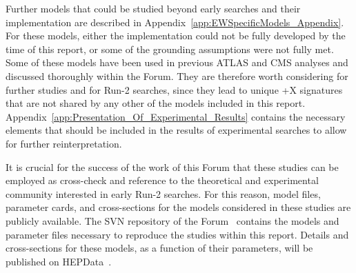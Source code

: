 Further models that could be studied
beyond early searches and their implementation are described in Appendix~\ref{app:EWSpecificModels_Appendix}. 
For these models, either the implementation could not be fully developed by the time of this report,
or some of the grounding assumptions were not fully met.  
Some of these models have been used in previous ATLAS and CMS analyses and discussed thoroughly within the Forum. 
They are therefore worth considering for further studies and for Run-2 searches, since they lead to unique \MET{}+X signatures 
that are not shared by any other of the models included in this report. 
Appendix~\ref{app:Presentation_Of_Experimental_Results} contains the necessary elements that
should be included in the results of experimental searches to allow for further reinterpretation. 

It is crucial for the success of the work of this Forum that these studies can be employed as cross-check
and reference to the theoretical and experimental community interested in early Run-2 searches. 
For this reason, model files, parameter cards, and cross-sections for the models considered in these studies 
are publicly available. The SVN repository of the Forum~\cite{ForumSVN} contains the models and parameter files
necessary to reproduce the studies within this report. Details and cross-sections for these models, 
as a function of their parameters, will be published on HEPData~\cite{HEPData}. 

